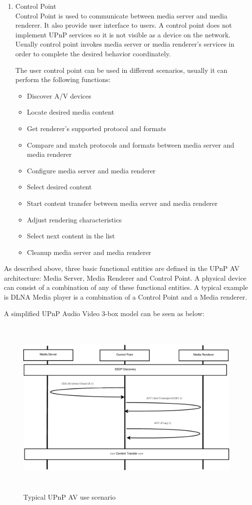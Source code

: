 \begin{enumerate}
\item Control Point \\
Control Point is used to communicate between media server and media renderer. It
also provide user interface to users. A control point does not implement UPnP
services so it is not visible as a device on the network. Usually control point
invokes media server or media renderer's services in order to complete the
desired behavior coordinately.

The user control point can be used in different scenarios, usually it can
perform the following functions:

\begin{itemize}
\item Discover A/V devices
\item Locate desired media content
\item Get renderer's supported protocol and formats
\item Compare and match protocols and formats between media server and media
renderer
\item Configure media server and media renderer
\item Select desired content
\item Start content transfer between media server and media renderer
\item Adjust rendering characteristics
\item Select next content in the list
\item Cleanup media server and media renderer
\end{itemize}

\end{enumerate}

As described above, three basic functional entities are defined in the UPnP AV
architecture\cite{upnp-av}: Media Server, Media Renderer and Control Point. A
physical device can consist of a combination of any of these functional
entities. A typical example is DLNA Media player is a combination of a Control
Point and a Media renderer.

A simplified UPnP Audio Video 3-box model \cite{DLNA_proxy} can be
seen as below:

\begin{figure}[htb]
\centering \includegraphics[height=9cm]{charts/chart1}
\caption{Typical UPnP AV use scenario \label{chart1}}
\end{figure}

